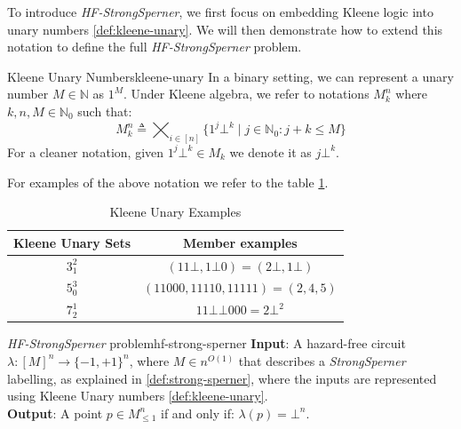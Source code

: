 To introduce \textit{HF-StrongSperner}, we first focus
on embedding Kleene logic into unary numbers \ref{def:kleene-unary}. We will
then demonstrate how to extend this notation to define the full \textit{HF-StrongSperner} problem.

\begin{definitionbox}{Kleene Unary Numbers}{kleene-unary}
    In a binary setting, we can represent a unary number $M \in \mathbb{N}$ as $1^M$.
    Under Kleene algebra, we refer to notations $M_k^n$ where $k,n,M \in \mathbb{N}_0$ such that:
    $$
        M^n_k \triangleq \bigtimes_{i \in [n]} \{1^j\bot^k \mid  j \in \mathbb{N}_0 : j + k \leq M\}
    $$
    For a cleaner notation, given $1^j\bot^k \in M_k$ we denote it as $j\bot^k$.
\end{definitionbox}

For examples of the above notation we refer to the table \ref{tab:chap-3:kleene-unary}.
\begin{table}[h!]
    \centering
    \begin{tabular}{|c|c|}
        \hline
        \rowcolor[HTML]{EAE1E1}
        {\color[HTML]{333333} \textbf{Kleene Unary Sets}} & {\color[HTML]{333333} \textbf{Member examples}} \\ \hline
        $3_1^2$                                           & $(11\bot, 1\bot0) = (2\bot, 1\bot)$             \\ \hline
        $5_0^3$                                           & $(11000, 11110, 11111) = (2, 4, 5)$             \\ \hline
        $7_2^1$                                           & $11\bot\bot000 = 2\bot^2$                       \\ \hline
    \end{tabular}
    \caption{Kleene Unary Examples}
    \label{tab:chap-3:kleene-unary}
\end{table}


\begin{definitionbox}{\textit{HF-StrongSperner} problem}{hf-strong-sperner}
    \textbf{Input}: A hazard-free circuit $\lambda: [M]^n \to \{-1, +1\}^n$, where $M \in n^{O(1)}$ that describes a \textit{StrongSperner} labelling,
    as explained in \ref{def:strong-sperner}, where the inputs are represented using Kleene Unary numbers \ref{def:kleene-unary}.\\
    \textbf{Output}: A point $p \in M_{\leq 1}^n$ if and only if: $\lambda(p) =  \bot^n$.
\end{definitionbox}

